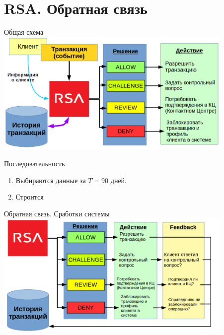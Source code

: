 \section{RSA. Обратная связь}\label{section:rsa_feedback}

\begin{frame}{Общая схема} 
	\includegraphics[width=11.5cm]{../pic/expert_system_rsa.png}
\end{frame}

\begin{frame}{Последовательность}
	\begin{enumerate}
		\item Выбираются данные за $T=90$ дней.
		\item Строится 
	\end{enumerate}

\end{frame}

\begin{frame}{Обратная связь. Сработки системы}\label{frame:rsa_feedback}
\includegraphics[width=11.5cm]{../pic/expert_system_rsa_feedback.png}
\end{frame}


